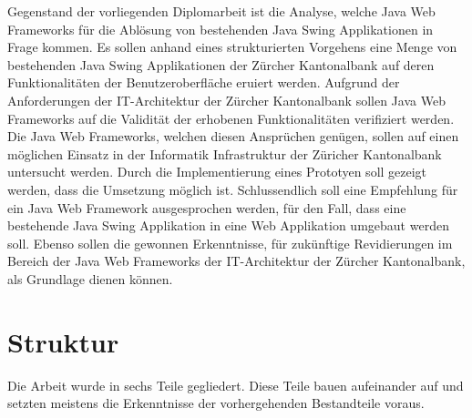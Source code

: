   Gegenstand der vorliegenden Diplomarbeit ist die Analyse, welche Java Web
  Frameworks für die Ablösung von bestehenden Java Swing Applikationen in Frage
  kommen. Es sollen anhand eines strukturierten Vorgehens eine Menge von
  bestehenden Java Swing Applikationen der Zürcher Kantonalbank auf deren
  Funktionalitäten der Benutzeroberfläche eruiert werden. Aufgrund der
  Anforderungen der IT-Architektur der Zürcher Kantonalbank sollen Java Web
  Frameworks auf die Validität der erhobenen Funktionalitäten verifiziert
  werden. Die Java Web Frameworks, welchen diesen Ansprüchen genügen, sollen
  auf einen möglichen Einsatz in der Informatik Infrastruktur der Züricher
  Kantonalbank untersucht werden. Durch die Implementierung eines Prototyen
  soll gezeigt werden, dass die Umsetzung möglich ist. Schlussendlich soll eine
  Empfehlung für ein Java Web Framework ausgesprochen werden, für den Fall,
  dass eine bestehende Java Swing Applikation in eine Web Applikation umgebaut
  werden soll. Ebenso sollen die gewonnen Erkenntnisse, für zukünftige
  Revidierungen im Bereich der Java Web Frameworks der IT-Architektur der
  Zürcher Kantonalbank, als Grundlage dienen können.
  
  \section{Struktur}
  
  Die Arbeit wurde in sechs Teile gegliedert. Diese Teile bauen aufeinander auf
  und setzten meistens die Erkenntnisse der vorhergehenden Bestandteile voraus.
  
